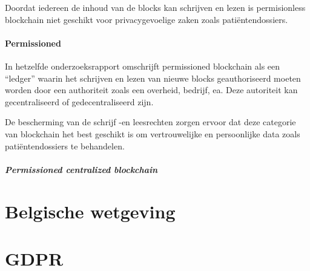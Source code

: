 Doordat iedereen de inhoud van de blocks kan schrijven en lezen is permisionless blockchain niet geschikt voor privacygevoelige zaken zoals patiëntendossiers.


\paragraph{Permissioned}

In hetzelfde onderzoeksrapport omschrijft \textcite{Yaga2018} permissioned blockchain als een ``ledger'' waarin het schrijven en lezen van nieuwe blocks geauthoriseerd moeten worden door een authoriteit zoals een overheid, bedrijf, ea. Deze autoriteit kan gecentraliseerd of gedecentraliseerd zijn.

De bescherming van de schrijf -en leesrechten zorgen ervoor dat deze categorie van blockchain het best geschikt is om vertrouwelijke en persoonlijke data zoals patiëntendossiers te behandelen.

\subparagraph{Permissioned centralized blockchain}



\section{Belgische wetgeving}


\section{GDPR}